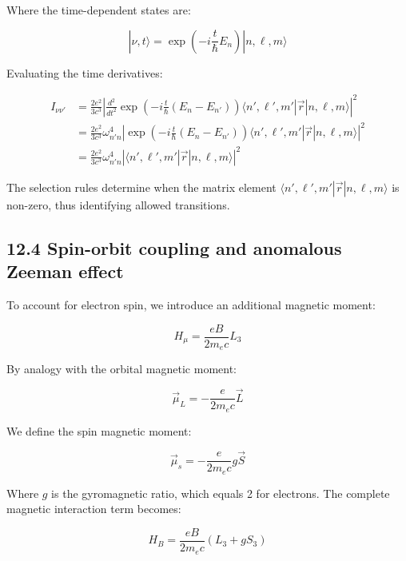 \documentclass[italian]{HKNdocument}
\begin{document}
Where the time-dependent states are:

\begin{equation*}
|\nu,t\rangle=\exp\left(-i\frac{t}{\hbar}E_n\right)|n,\ell,m\rangle \tag{12.30}
\end{equation*}

Evaluating the time derivatives:

\begin{align*}
I_{\nu\nu'} &=\frac{2e^2}{3c^3}\left|\frac{d^2}{dt^2}\exp\left(-i\frac{t}{\hbar}(E_n-E_{n'})\right)\langle n',\ell',m'|\vec{r}|n,\ell,m\rangle\right|^2\\
&=\frac{2e^2}{3c^3}\omega_{n'n}^4\left|\exp\left(-i\frac{t}{\hbar}(E_n-E_{n'})\right)\langle n',\ell',m'|\vec{r}|n,\ell,m\rangle\right|^2 \tag{12.31}\\
&=\frac{2e^2}{3c^3}\omega_{n'n}^4\left|\langle n',\ell',m'|\vec{r}|n,\ell,m\rangle\right|^2
\end{align*}

The selection rules determine when the matrix element $\langle n',\ell',m'|\vec{r}|n,\ell,m\rangle$ is non-zero, thus identifying allowed transitions.

\subsection*{12.4 Spin-orbit coupling and anomalous Zeeman effect}
To account for electron spin, we introduce an additional magnetic moment:

\begin{equation*}
H_{\mu}=\frac{eB}{2m_e c}L_3 \tag{12.32}
\end{equation*}

By analogy with the orbital magnetic moment:

\begin{equation*}
\vec{\mu}_L=-\frac{e}{2m_e c}\vec{L} \tag{12.33}
\end{equation*}

We define the spin magnetic moment:

\begin{equation*}
\vec{\mu}_s=-\frac{e}{2m_e c}g\vec{S} \tag{12.34}
\end{equation*}

Where $g$ is the gyromagnetic ratio, which equals 2 for electrons. The complete magnetic interaction term becomes:

\begin{equation*}
H_B=\frac{eB}{2m_e c}(L_3+gS_3) \tag{12.35}
\end{equation*}
\end{document}
